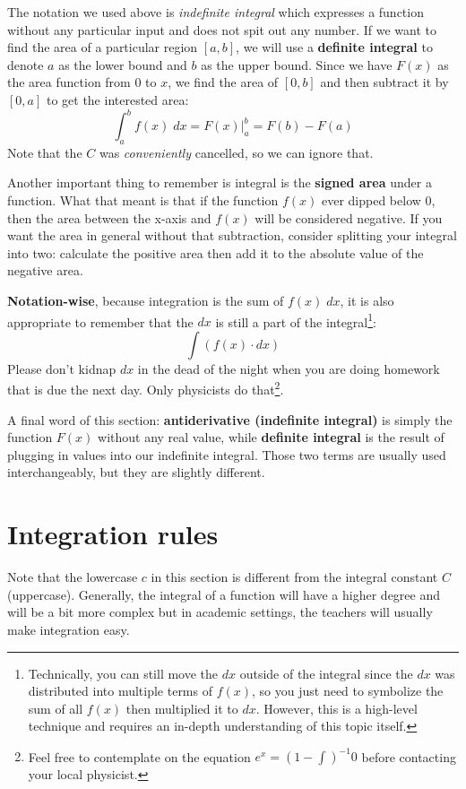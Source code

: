 The notation we used above is \textit{indefinite integral} which expresses a function without any particular input and does not spit out any number. If we want to find the area of a particular region $[a,b]$, we will use a \textbf{definite integral} to denote $a$ as the lower bound and $b$ as the upper bound. Since we have $F(x)$ as the area function from $0$ to $x$, we find the area of $[0,b]$ and then subtract it by $[0,a]$ to get the interested area:
\begin{equation}
    \int^b_a f(x) \;dx
    = \left. F(x) \right|^b_a
    = F(b) - F(a)
\end{equation}
Note that the $C$ was \textit{conveniently} cancelled, so we can ignore that.

Another important thing to remember is integral is the \textbf{signed area} under a function. What that meant is that if the function $f(x)$ ever dipped below $0$, then the area between the x-axis and $f(x)$ will be considered negative. If you want the area in general without that subtraction, consider splitting your integral into two: calculate the positive area then add it to the absolute value of the negative area.

\textbf{Notation-wise}, because integration is the sum of $f(x)\;dx$, it is also appropriate to remember that the $dx$ is still a part of the integral\footnote{Technically, you can still move the $dx$ outside of the integral since the $dx$ was distributed into multiple terms of $f(x)$, so you just need to symbolize the sum of all $f(x)$ then multiplied it to $dx$. However, this is a high-level technique and requires an in-depth understanding of this topic itself.}:
\[
    \int (f(x)\cdot dx)
\]
Please don't kidnap $dx$ in the dead of the night when you are doing homework that is due the next day. Only physicists do that\footnote{Feel free to contemplate on the equation $e^x=(1-\int)^{-1}0$ before contacting your local physicist.}. 

A final word of this section: \textbf{antiderivative (indefinite integral)} is simply the function $F(x)$ without any real value, while \textbf{definite integral} is the result of plugging in values into our indefinite integral. Those two terms are usually used interchangeably, but they are slightly different.

\section{Integration rules}
Note that the lowercase $c$ in this section is different from the integral constant $C$ (uppercase). Generally, the integral of a function will have a higher degree and will be a bit more complex but in academic settings, the teachers will usually make integration easy.


